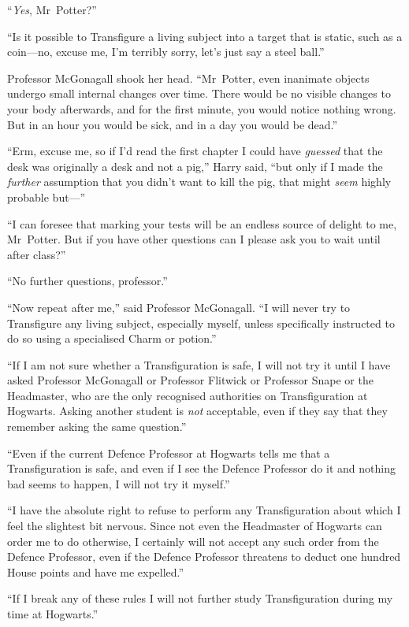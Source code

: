 “\emph{Yes}, Mr~Potter?”

“Is it possible to Transfigure a living subject into a target that is static, such as a coin—no, excuse me, I’m terribly sorry, let’s just say a steel ball.”

Professor McGonagall shook her head. “Mr~Potter, even inanimate objects undergo small internal changes over time. There would be no visible changes to your body afterwards, and for the first minute, you would notice nothing wrong. But in an hour you would be sick, and in a day you would be dead.”

“Erm, excuse me, so if I’d read the first chapter I could have \emph{guessed} that the desk was originally a desk and not a pig,” Harry said, “but only if I made the \emph{further} assumption that you didn’t want to kill the pig, that might \emph{seem} highly probable but—”

“I can foresee that marking your tests will be an endless source of delight to me, Mr~Potter. But if you have other questions can I please ask you to wait until after class?”

“No further questions, professor.”

“Now repeat after me,” said Professor McGonagall. “I will never try to Transfigure any living subject, especially myself, unless specifically instructed to do so using a specialised Charm or potion.”

“If I am not sure whether a Transfiguration is safe, I will not try it until I have asked Professor McGonagall or Professor Flitwick or Professor Snape or the Headmaster, who are the only recognised authorities on Transfiguration at Hogwarts. Asking another student is \emph{not} acceptable, even if they say that they remember asking the same question.”

“Even if the current Defence Professor at Hogwarts tells me that a Transfiguration is safe, and even if I see the Defence Professor do it and nothing bad seems to happen, I will not try it myself.”

“I have the absolute right to refuse to perform any Transfiguration about which I feel the slightest bit nervous. Since not even the Headmaster of Hogwarts can order me to do otherwise, I certainly will not accept any such order from the Defence Professor, even if the Defence Professor threatens to deduct one hundred House points and have me expelled.”

“If I break any of these rules I will not further study Transfiguration during my time at Hogwarts.”

